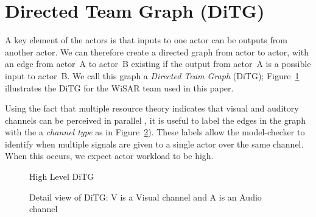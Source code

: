 \section{Directed Team Graph (DiTG)}
A key element of the actors is that inputs to one actor can be outputs from another actor.  We can therefore create a directed graph from actor to actor, with an edge from actor~A to actor~B existing if the output from actor~A is a possible input to actor~B.  We call this graph a {\em Directed Team Graph} (DiTG); Figure~\ref{fig:ditg} illustrates the DiTG for the WiSAR team used in this paper.   

Using the fact that multiple resource theory indicates that visual and auditory channels can be perceived in parallel \cite{wickens2002multiple}, it is useful to label the edges in the graph with the a {\em channel type} as in Figure~\ref{fig:ditg_detail}).  These labels allow the model-checker to identify when multiple signals are given to a single actor over the same channel.  When this occurs, we expect actor workload to be high.


\begin{figure}[hbt]
\center
\setlength{\abovecaptionskip}{1mm}
\setlength{\belowcaptionskip}{1mm}
\setlength{\textfloatsep}{1mm}
\setlength{\floatsep}{1mm}
\caption{High Level DiTG}
\label{fig:ditg}
\end{figure}

\begin{figure}[hbt]
\center
\setlength{\abovecaptionskip}{1mm}
\setlength{\belowcaptionskip}{1mm}
\setlength{\textfloatsep}{1mm}
\setlength{\floatsep}{1mm}
\caption{Detail view of DiTG: V is a Visual channel and A is an Audio channel}
\label{fig:ditg_detail}
\end{figure}

